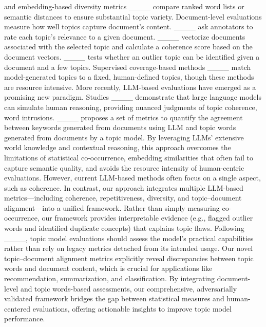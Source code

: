 and embedding-based diversity metrics ____ 
compare ranked word lists or semantic distances to ensure substantial topic variety. 
Document-level evaluations measure how well topics capture document's content. ____ 
ask annotators to rate each topic’s relevance to a given document.
____ vectorize documents associated with the selected topic and calculate a coherence score based on the document vectors.
____ 
tests whether an outlier topic can be identified given a document and a few topics.
Supervised coverage-based methods 
____
match model-generated topics to a fixed, human-defined topics, though these methods are resource intensive.
More recently, LLM-based evaluations have emerged as a promising new paradigm. Studies ____
demonstrate that large language models can simulate human reasoning, providing nuanced judgments of topic coherence, word intrusions. 
____ proposes a set of metrics to quantify the agreement between keywords generated from documents using LLM and topic words generated from documents by a topic model.
By leveraging LLMs’ extensive world knowledge and contextual reasoning, this approach overcomes the limitations of statistical co-occurrence, embedding similarities that often fail to capture semantic quality, and avoids the resource intensity of human-centric evaluations.
However, current LLM-based methods often focus on a single aspect, such as coherence. In contrast, our approach integrates multiple LLM-based metrics—including coherence, repetitiveness, diversity, and topic–document alignment—into a unified framework. Rather than simply measuring co-occurrence, our framework provides interpretable evidence (e.g., flagged outlier words and identified duplicate concepts) that explains topic flaws. Following ____, topic model evaluations should assess the model's practical capabilities rather than rely on legacy metrics detached from its intended usage. Our novel topic–document alignment metrics explicitly reveal discrepancies between topic words and document content, which is crucial for applications like recommendation, summarization, and classification.
By integrating document-level and topic words-based assessments, our comprehensive, adversarially validated framework bridges the gap between statistical measures and human-centered evaluations, offering actionable insights to improve topic model performance.